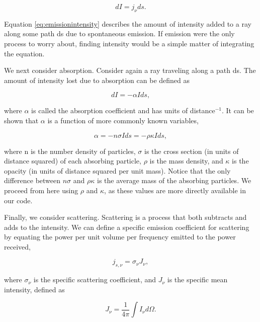 \begin{equation}
\label{eq:emissionintensity}
dI = j_{\nu} ds.
\end{equation}

Equation \ref{eq:emissionintensity} describes the amount of intensity added to a ray along some path ds due to spontaneous emission. If emission were the only process to worry about, finding intensity would be a simple matter of integrating the equation.

We next consider absorption. Consider again a ray traveling along a path ds. The amount of intensity lost due to absorption can be defined as

\begin{equation}
\label{eq:absorption}
dI = -\alpha I ds,
\end{equation}

\noindent
where $\alpha$ is called the absorption coefficient and has units of distance$^{-1}$. It can be shown \citep{rybickiLightman86} that $\alpha$ is a function of more commonly known variables,

\begin{equation}
\label{eq:absorptioncoeff}
\alpha = -n \sigma I ds = -\rho \kappa I ds,
\end{equation}

\noindent
where n is the number density of particles, $\sigma$ is the cross section (in units of distance squared) of each absorbing particle, $\rho$ is the mass density, and $\kappa$ is the opacity (in units of distance squared per unit mass). Notice that the only difference between $n \sigma$ and $\rho \kappa$ is the average mass of the absorbing particles. We proceed from here using $\rho$ and $\kappa$, as these values are more directly available in our code.

Finally, we consider scattering. Scattering is a process that both subtracts and adds to the intensity. We can define a specific emission coefficient for scattering by equating the power per unit volume per frequency emitted to the power received,

\begin{equation}
\label{eq:scatteringcoefficient}
j_{s,\nu} = \sigma_{\nu} J_{\nu},
\end{equation}

\noindent
where $\sigma_{\nu}$ is the specific scattering coefficient, and $J_{\nu}$ is the specific mean intensity, defined as

\begin{equation}
\label{eq:meanintensity}
J_{\nu} = \frac{1}{4\pi}\int I_{\nu} d\Omega.
\end{equation}

